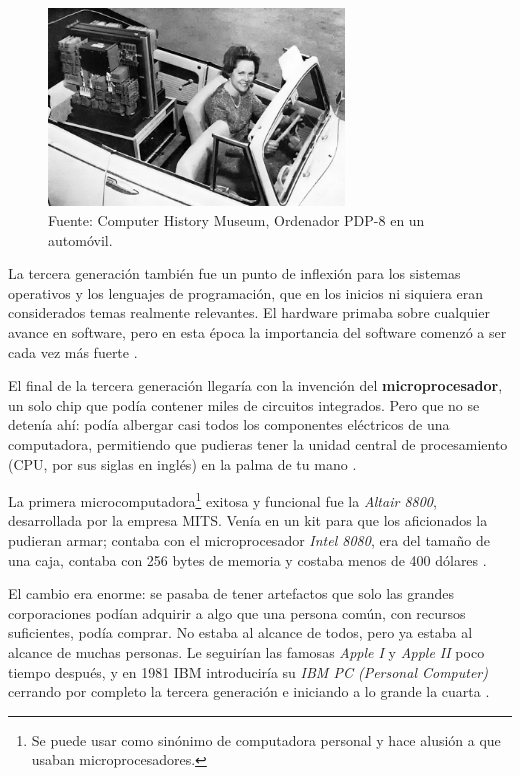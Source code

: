 \documentclass[letterpaper,12pt,oneside]{book}
\begin{document}
		\begin{figure}
		    \centering
		    \includegraphics[width=0.7\textwidth]{media/Historia/CHM_computers_1964.pdp8.jpg}
		    \caption{Fuente: Computer History Museum, Ordenador PDP-8 en un automóvil.} %
	    	\label{fig:pdp8}
		\end{figure}
		
		La tercera generación también fue un punto de inflexión para los sistemas operativos y los lenguajes de programación, que en los inicios
		ni siquiera eran considerados temas realmente relevantes. El hardware primaba sobre cualquier avance en software, pero en esta época
		la importancia del software comenzó a ser cada vez más fuerte \cite{tanenbaum_modern_2002}.
		
		El final de la tercera generación llegaría con la invención del \textbf{microprocesador}, un solo chip que podía contener miles de circuitos integrados.
		Pero que no se detenía ahí: podía albergar casi todos los componentes eléctricos de una computadora, permitiendo que pudieras tener la unidad central de procesamiento (CPU, por sus
		siglas en inglés) en la palma de tu mano \cite{null_essentials_2003}.
  
        La primera microcomputadora\footnote{Se puede usar como sinónimo de computadora personal y hace alusión a que usaban microprocesadores.} exitosa y funcional
		fue la \textit{Altair 8800}, desarrollada por la empresa MITS. Venía en un kit para que los aficionados la pudieran armar; contaba
		con el microprocesador \textit{Intel 8080}, era del tamaño de una caja, contaba con 256 bytes de memoria y costaba menos de 400 dólares \cite{null_essentials_2003}.
  
        
        El cambio
		era enorme: se pasaba de tener artefactos que solo las grandes corporaciones podían adquirir a algo que una persona común, con recursos suficientes,
		podía comprar. No estaba al alcance de todos, pero ya estaba al alcance de muchas personas. Le seguirían las famosas \textit{Apple I}
		y \textit{Apple II} poco tiempo después, y en 1981 IBM introduciría su \textit{IBM PC (Personal Computer)} cerrando por completo la tercera generación e iniciando a lo grande la cuarta \cite{null_essentials_2003}.
\end{document}
